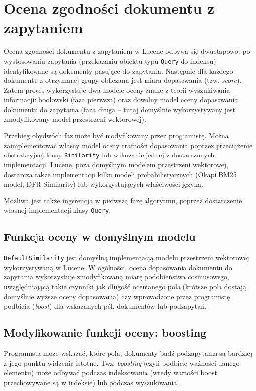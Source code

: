 \chapter{Ocena zgodności dokumentu z zapytaniem}

Ocena zgodności dokumentu z zapytaniem w Lucene odbywa się dwuetapowo: po wystosowaniu zapytania (przekazaniu obiektu typu \texttt{Query} do indeksu) identyfikowane są dokumenty pasujące do zapytania. Następnie dla każdego dokumentu z otrzymanej grupy obliczana jest miara dopasowania (tzw. \emph{score}). Zatem proces wykorzystuje dwa modele oceny znane z teorii wyszukiwania informacji: boolowski (faza pierwsza) oraz dowolny model oceny dopasowania dokumentu do zapytania (faza druga -- tutaj domyślnie wykorzystywany jest zmodyfikowany model przestrzeni wektorowej). 

Przebieg obydwóch faz może być modyfikowany przez programistę. Można zaimplementować własny model oceny trafności dopasowania poprzez przeciążenie abstrakcyjnej klasy \texttt{Similarity} lub wskazanie jednej z dostarczonych implementacji. Lucene, poza domyślnym modelem przestrzeni wektorowej, dostarcza także implementacji kilku modeli probabilistycznych (Okapi BM25 model, DFR Similarity) lub wykorzystujących właściwości języka.

Możliwa jest także ingerencja w pierwszą fazę algorytmu, poprzez dostarczenie własnej implementacji klasy \texttt{Query}.

\section{Funkcja oceny w domyślnym modelu}

\texttt{DefaultSimilarity} jest domyślną implementacją modelu przestrzeni wektorowej wykorzystywaną w Lucene. W ogólności, ocena dopasowania dokumentu do zapytania wykorzystuje zmodyfikowaną miarę podobieństwa cosinusowego, uwzględniającą takie czynniki jak długość ocenianego pola (krótsze pola dostają domyślnie wyższe oceny dopasowania) czy wprowadzone przez programistę podbicia (\emph{boost}) dla wskazanych pól, dokumentów lub podzapytań.

\section{Modyfikowanie funkcji oceny: boosting}

Programista może wskazać, które pola, dokumenty bądź podzapytania są bardziej z jego punktu widzenia istotne. Twz. \emph{boosting} (czyli podbicie ważności danego elementu) może odbywać podczas indeksowania (wtedy wartości boost przechowywane są w indeksie) lub podczas wyszukiwania. 
